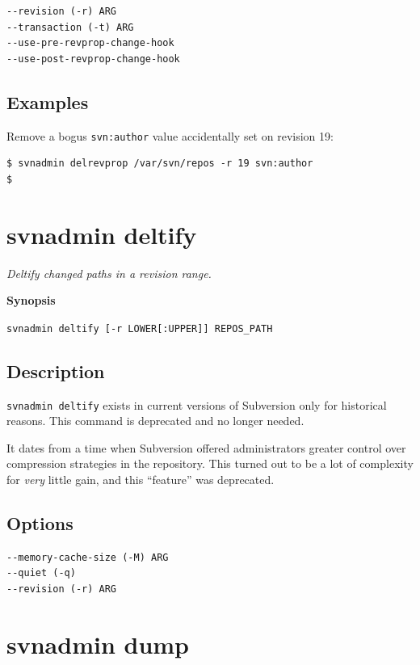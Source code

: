 \begin{verbatim}
--revision (-r) ARG
--transaction (-t) ARG
--use-pre-revprop-change-hook
--use-post-revprop-change-hook
\end{verbatim}

\subsection{Examples}

Remove a bogus \texttt{svn:author} value accidentally set on revision 19:

\begin{verbatim}
$ svnadmin delrevprop /var/svn/repos -r 19 svn:author
$
\end{verbatim}

\section{svnadmin deltify}\label{svn.ref.svnadmin.c.deltify}

\emph{Deltify changed paths in a revision range.}

\textbf{Synopsis}

\texttt{svnadmin\ deltify\ {[}-r\ LOWER{[}:UPPER{]}{]}\ REPOS\_PATH}

\subsection{Description}

\texttt{svnadmin\ deltify} exists in current versions of Subversion only
for historical reasons. This command is deprecated and no longer needed.

It dates from a time when Subversion offered administrators greater
control over compression strategies in the repository. This turned out
to be a lot of complexity for \emph{very} little gain, and this
``feature'' was deprecated.

\subsection{Options}

\begin{verbatim}
--memory-cache-size (-M) ARG
--quiet (-q)
--revision (-r) ARG
\end{verbatim}

\section{svnadmin dump}\label{svn.ref.svnadmin.c.dump}

